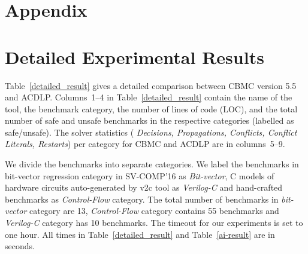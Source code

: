 \appendix
\section*{Appendix}
%
\section{Detailed Experimental Results}\label{appendix:extended_result}
Table~\ref{detailed_result} gives a detailed comparison between CBMC version
5.5 and ACDLP.  Columns~1--4 in Table~\ref{detailed_result} contain the
name of the tool, the benchmark category, the number of lines of code (LOC),
and the total number of safe and unsafe benchmarks in the respective
categories (labelled as safe/unsafe).  The solver statistics ({\em
Decisions, Propagations, Conflicts, Conflict Literals, Restarts}) per
category for CBMC and ACDLP are in columns~5--9.
%

We divide the benchmarks into separate categories. 
We label the benchmarks in bit-vector regression category in SV-COMP'16 
as {\em Bit-vector}, C models of hardware circuits auto-generated by v2c 
tool as {\em Verilog-C} and hand-crafted benchmarks as {\em Control-Flow} 
category.  The total number of benchmarks in {\em bit-vector} category are 13, 
{\em Control-Flow} category contains 55 benchmarks and 
{\em Verilog-C} category has 10 benchmarks. The timeout for our
experiments is set to one hour.  All times in Table~\ref{detailed_result} 
and Table~\ref{ai-result} are in seconds. 

